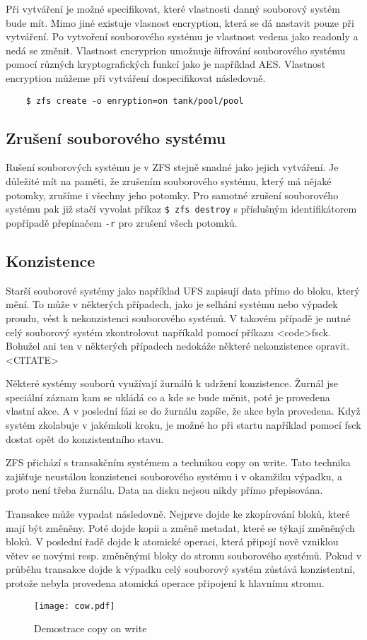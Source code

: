     Při vytváření je možné specifikovat, které vlastnosti danný souborový systém bude mít. Mimo jiné existuje vlasnost encryption, která se dá nastavit pouze při vytváření. Po vytvoření souborového systému je vlastnost vedena jako readonly a nedá se změnit. Vlastnost encryprion umožnuje šifrování souborového systému pomocí různých kryptografických funkcí jako je například AES. Vlastnost encryption můžeme při vytváření dospecifikovat následovně.
    \begin{verbatim}
    $ zfs create -o enryption=on tank/pool/pool
    \end{verbatim}    
    \subsection{Zrušení souborového systému}
    Rušení souborových systému je v ZFS stejně snadné jako jejich vytváření. Je důležité mít na paměti, že zrušením souborového systému, který má nějaké potomky, zrušíme i všechny jeho potomky. Pro samotné zrušení souborového systému pak již stačí vyvolat příkaz \verb|$ zfs destroy| s příslušným identifikátorem popřípadě přepínačem \verb|-r| pro zrušení všech potomků.
    \subsection{Konzistence}
    Starší souborové systémy jako například UFS zapisují data přímo do bloku, který mění. To může v některých případech, jako je selhání systému nebo výpadek proudu, vést k nekonzistenci souborového systémů. V takovém případě je nutné celý souborový systém zkontrolovat napříkald pomocí příkazu <code>fsck. Bohužel ani ten v některých případech
    nedokáže některé nekonzistence opravit. <CITATE>

    Některé systémy souborů využívají žurnálů k udržení konzistence. Žurnál jse speciální záznam kam se ukládá co a kde se bude měnit, poté
    je provedena vlastní akce. A v poslední fázi se do žurnálu zapíše, že akce byla provedena. Když systém zkolabuje v jakémkoli kroku, je možné ho při startu například pomocí
    fsck dostat opět do konzistentního stavu.

    ZFS přichází s transakčním systémem a technikou copy on write. Tato technika zajišťuje neustálou konzistenci souborového systému i v okamžiku výpadku, a proto není třeba žurnálu. Data na disku nejsou nikdy přímo přepisována.

    Transakce může vypadat následovně. Nejprve dojde ke zkopírování bloků, které mají být změněny. Poté dojde kopii a změně metadat, které se týkají změněných bloků. V poslední
    řadě dojde k atomické operaci, která připojí nově vzniklou větev se novými resp. změněnými bloky do stromu souborového systémů. Pokud v průběhu transakce dojde k výpadku
    celý souborový systém zůstává konzistentní, protože nebyla provedena atomická operace připojení k hlavnímu stromu.
    \begin{figure}[h]
        \caption{Demostrace copy on write}
        \label{cow}
        \texttt{[image: cow.pdf]}
    \end{figure}
